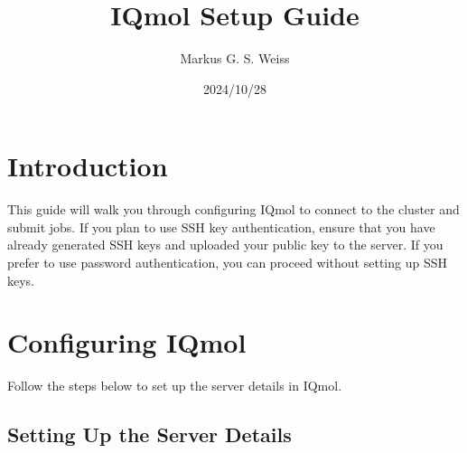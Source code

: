 \documentclass[12pt,letterpaper]{article}
\begin{document}
\title{\LARGE IQmol Setup Guide}
\author{Markus G. S. Weiss}
\date{2024/10/28}
\maketitle

\tableofcontents
\newpage
\section{Introduction}

This guide will walk you through configuring IQmol to connect to the cluster and submit jobs. If you plan to use SSH key authentication, ensure that you have already generated SSH keys and uploaded your public key to the server. If you prefer to use password authentication, you can proceed without setting up SSH keys.

\section{Configuring IQmol}

Follow the steps below to set up the server details in IQmol.

\subsection*{Setting Up the Server Details}
\end{document}
